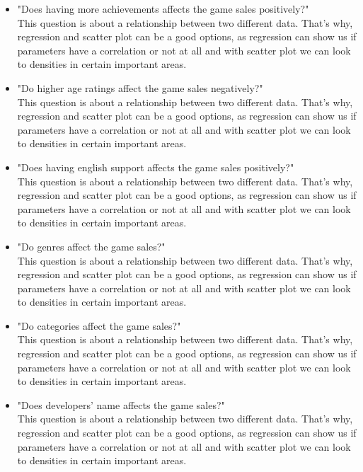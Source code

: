\documentclass[conference]{IEEEtran}
\begin{document}
\begin{itemize}
    \item "Does having more achievements affects the game sales positively?" \\ This question is about a relationship between two different data. That's why, regression and scatter plot can be a good options, as regression can show us if parameters have a correlation or not at all and with scatter plot we can look to densities in certain important areas.\\
    \item "Do higher age ratings affect the game sales negatively?" \\ This question is about a relationship between two different data. That's why, regression and scatter plot can be a good options, as regression can show us if parameters have a correlation or not at all and with scatter plot we can look to densities in certain important areas. \\
    \item "Does having english support affects the game sales positively?" \\This question is about a relationship between two different data. That's why, regression and scatter plot can be a good options, as regression can show us if parameters have a correlation or not at all and with scatter plot we can look to densities in certain important areas.\\
    \item "Do genres affect the game sales?" \\ This question is about a relationship between two different data. That's why, regression and scatter plot can be a good options, as regression can show us if parameters have a correlation or not at all and with scatter plot we can look to densities in certain important areas.\\
    \item "Do categories affect the game sales?" \\ This question is about a relationship between two different data. That's why, regression and scatter plot can be a good options, as regression can show us if parameters have a correlation or not at all and with scatter plot we can look to densities in certain important areas. \\
    \item "Does developers' name affects the game sales?" \\ This question is about a relationship between two different data. That's why, regression and scatter plot can be a good options, as regression can show us if parameters have a correlation or not at all and with scatter plot we can look to densities in certain important areas.\\

\end{itemize}
\end{document}
